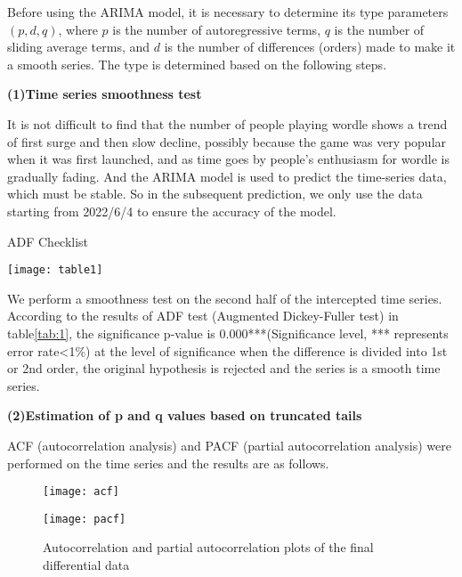 \documentclass[12pt]{mcmthesis}
\begin{document}
Before using the ARIMA model, it is necessary to determine its type parameters $ (p, d, q) $, where $ p $ is the number of autoregressive terms, $ q $ is the number of sliding average terms, and $ d $ is the number of differences (orders) made to make it a smooth series. The type is determined based on the following steps.

\textbf{(1)Time series smoothness test}

It is not difficult to find that the number of people playing wordle shows a trend of first surge and then slow decline, possibly because the game was very popular when it was first launched, and as time goes by people's enthusiasm for wordle is gradually fading. And the ARIMA model is used to predict the time-series data, which must be stable. So in the subsequent prediction, we only use the data starting from 2022/6/4 to ensure the accuracy of the model.
\begin{table}[!htbp]
	\small
	\centering
	\caption{ADF Checklist}
	\texttt{[image: table1]}
	\label{tab:1}
\end{table}

We perform a smoothness test on the second half of the intercepted time series\cite{2}. According to the results of ADF test (Augmented Dickey-Fuller test) in table\ref{tab:1}, the significance p-value is 0.000***(Significance level, *** represents error rate<1\%) at the level of significance when the difference is divided into 1st or 2nd order, the original hypothesis is rejected and the series is a smooth time series.

\textbf{(2)Estimation of p and q values based on truncated tails}

ACF (autocorrelation analysis) and PACF (partial autocorrelation analysis) were performed on the time series and the results are as follows.
\begin{figure}[h]
	\centering
	\begin{minipage}[c]{0.48\textwidth}
		\centering
		\texttt{[image: acf]}
		\label{fig3_1}
	\end{minipage}
	\begin{minipage}[c]{0.48\textwidth}
		\centering
		\texttt{[image: pacf]}
		\label{fig3_2}
	\end{minipage}
	\caption{Autocorrelation and partial autocorrelation plots of the final differential data}
	\label{fig:3}
\end{figure}
\end{document}
